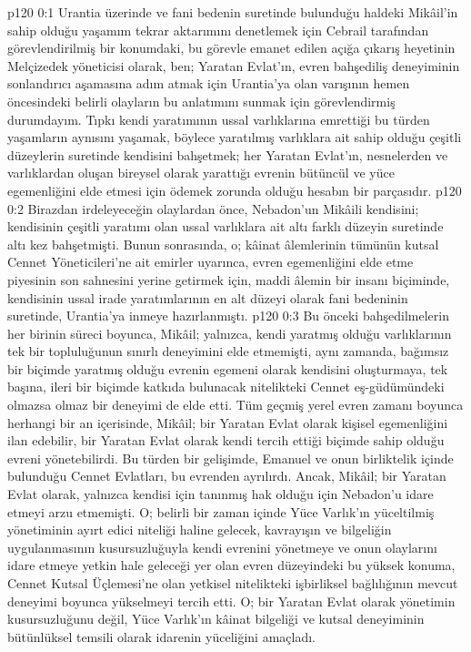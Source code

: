 \vs p120 0:1 Urantia üzerinde ve fani bedenin suretinde bulunduğu haldeki Mikâil’in sahip olduğu yaşamım tekrar aktarımını denetlemek için Cebrail tarafından görevlendirilmiş bir konumdaki, bu görevle emanet edilen açığa çıkarış heyetinin Melçizedek yöneticisi olarak, ben; Yaratan Evlat’ın, evren bahşediliş deneyiminin sonlandırıcı aşamasına adım atmak için Urantia’ya olan varışının hemen öncesindeki belirli olayların bu anlatımını sunmak için görevlendirmiş durumdayım. Tıpkı kendi yaratımının ussal varlıklarına emrettiği bu türden yaşamların aynısını yaşamak, böylece yaratılmış varlıklara ait sahip olduğu çeşitli düzeylerin suretinde kendisini bahşetmek; her Yaratan Evlat’ın, nesnelerden ve varlıklardan oluşan bireysel olarak yarattığı evrenin bütüncül ve yüce egemenliğini elde etmesi için ödemek zorunda olduğu hesabın bir parçasıdır.
\vs p120 0:2 Birazdan irdeleyeceğin olaylardan önce, Nebadon’un Mikâili kendisini; kendisinin çeşitli yaratımı olan ussal varlıklara ait altı farklı düzeyin suretinde altı kez bahşetmişti. Bunun sonrasında, o; kâinat âlemlerinin tümünün kutsal Cennet Yöneticileri’ne ait emirler uyarınca, evren egemenliğini elde etme piyesinin son sahnesini yerine getirmek için, maddi âlemin bir insanı biçiminde, kendisinin ussal irade yaratımlarının en alt düzeyi olarak fani bedeninin suretinde, Urantia’ya inmeye hazırlanmıştı.
\vs p120 0:3 Bu önceki bahşedilmelerin her birinin süreci boyunca, Mikâil; yalnızca, kendi yaratmış olduğu varlıklarının tek bir topluluğunun sınırlı deneyimini elde etmemişti, aynı zamanda, bağımsız bir biçimde yaratmış olduğu evrenin egemeni olarak kendisini oluşturmaya, tek başına, ileri bir biçimde katkıda bulunacak nitelikteki Cennet eş\hyp{}güdümündeki olmazsa olmaz bir deneyimi de elde etti. Tüm geçmiş yerel evren zamanı boyunca herhangi bir an içerisinde, Mikâil; bir Yaratan Evlat olarak kişisel egemenliğini ilan edebilir, bir Yaratan Evlat olarak kendi tercih ettiği biçimde sahip olduğu evreni yönetebilirdi. Bu türden bir gelişimde, Emanuel ve onun birliktelik içinde bulunduğu Cennet Evlatları, bu evrenden ayrılırdı. Ancak, Mikâil; bir Yaratan Evlat olarak, yalnızca kendisi için tanınmış hak olduğu için Nebadon’u idare etmeyi arzu etmemişti. O; belirli bir zaman içinde Yüce Varlık’ın yüceltilmiş yönetiminin ayırt edici niteliği haline gelecek, kavrayışın ve bilgeliğin uygulanmasının kusursuzluğuyla kendi evrenini yönetmeye ve onun olaylarını idare etmeye yetkin hale geleceği yer olan evren düzeyindeki bu yüksek konuma, Cennet Kutsal Üçlemesi’ne olan yetkisel nitelikteki işbirliksel bağlılığının mevcut deneyimi boyunca yükselmeyi tercih etti. O; bir Yaratan Evlat olarak yönetimin kusursuzluğunu değil, Yüce Varlık’ın kâinat bilgeliği ve kutsal deneyiminin bütünlüksel temsili olarak idarenin yüceliğini amaçladı.
